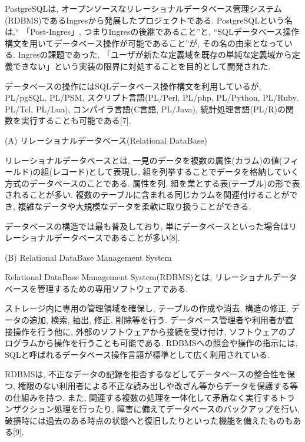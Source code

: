 PostgreSQLは, オープンソースなリレーショナルデータベース管理システム(RDBMS)であるIngresから発展したプロジェクトである.
PostgreSQLという名は,“ 「Post-Ingres」, つまりIngresの後継であること”と, “SQLデータベース操作構文を用いてデータベース操作が可能であること”が, その名の由来となっている.
Ingresの課題であった, 「ユーザが新たな定義域を既存の単純な定義域から定義できない」という実装の限界に対処することを目的として開発された.

データベースの操作にはSQLデータベース操作構文を利用しているが, PL/pgSQL, PL/PSM, スクリプト言語(PL/Perl, PL/php, PL/Python, PL/Ruby, PL/Tcl, PL/Lua), コンパイラ言語(C言語, PL/Java), 統計処理言語(PL/R)の関数を実行することも可能である[7].

\begin{description}
\item (A) リレーショナルデータベース(Relational DataBase)

リレーショナルデータベースとは, 一見のデータを複数の属性(カラム)の値(フィールド)の組(レコード)として表現し, 組を列挙することでデータを格納していく方式のデータベースのことである.
属性を列, 組を業とする表(テーブル)の形で表されることが多い.
複数のテーブルに含まれる同じカラムを関連付けることができ, 複雑なデータや大規模なデータを柔軟に取り扱うことができる.

データベースの構造では最も普及しており, 単にデータベースといった場合はリレーショナルデータベースであることが多い[8].

\item (B) Relational DataBase Management System

Relational DataBase Management System(RDBMS)とは, リレーショナルデータベースを管理するための専用ソフトウェアである.

ストレージ内に専用の管理領域を確保し, テーブルの作成や消去, 構造の修正, データの追加, 検索, 抽出, 修正, 削除等を行う.
データベース管理者や利用者が直接操作を行う他に, 外部のソフトウェアから接続を受け付け, ソフトウェアのプログラムから操作を行うことも可能である.
RDBMSへの照会や操作の指示には, SQLと呼ばれるデータベース操作言語が標準として広く利用されている.

RDBMSは, 不正なデータの記録を拒否するなどしてデータベースの整合性を保つ, 権限のない利用者による不正な読み出しや改ざん等からデータを保護する等の仕組みを持つ.
また, 関連する複数の処理を一体化して矛盾なく実行するトランザクション処理を行ったり, 障害に備えてデータベースのバックアップを行い, 破損時には過去のある時点の状態へと復旧したりといった機能を備えたものもある[9].
\end{description}

